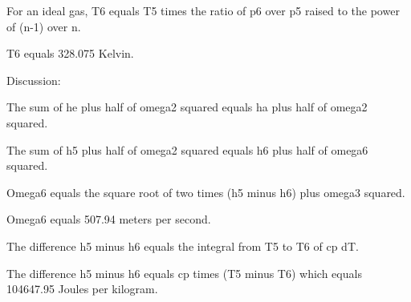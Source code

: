 For an ideal gas, T6 equals T5 times the ratio of p6 over p5 raised to the power of (n-1) over n.

T6 equals 328.075 Kelvin.

Discussion:

The sum of he plus half of omega2 squared equals ha plus half of omega2 squared.

The sum of h5 plus half of omega2 squared equals h6 plus half of omega6 squared.

Omega6 equals the square root of two times (h5 minus h6) plus omega3 squared.

Omega6 equals 507.94 meters per second.

The difference h5 minus h6 equals the integral from T5 to T6 of cp dT.

The difference h5 minus h6 equals cp times (T5 minus T6) which equals 104647.95 Joules per kilogram.